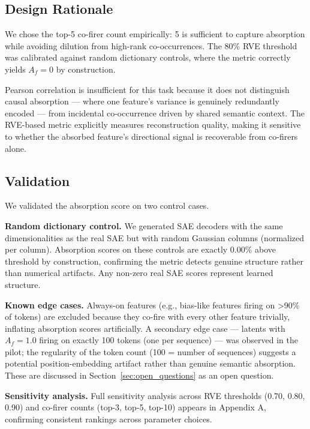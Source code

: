 \documentclass{article}
\begin{document}
\subsection{Design Rationale}

We chose the top-5 co-firer count empirically: 5 is sufficient to capture absorption while avoiding dilution from high-rank co-occurrences. The 80\% RVE threshold was calibrated against random dictionary controls, where the metric correctly yields $A_f = 0$ by construction.

Pearson correlation is insufficient for this task because it does not distinguish causal absorption --- where one feature's variance is genuinely redundantly encoded --- from incidental co-occurrence driven by shared semantic context. The RVE-based metric explicitly measures reconstruction quality, making it sensitive to whether the absorbed feature's directional signal is recoverable from co-firers alone.

\subsection{Validation}

We validated the absorption score on two control cases.

\textbf{Random dictionary control.} We generated SAE decoders with the same dimensionalities as the real SAE but with random Gaussian columns (normalized per column). Absorption scores on these controls are exactly 0.00\% above threshold by construction, confirming the metric detects genuine structure rather than numerical artifacts. Any non-zero real SAE scores represent learned structure.

\textbf{Known edge cases.} Always-on features (e.g., bias-like features firing on >90\% of tokens) are excluded because they co-fire with every other feature trivially, inflating absorption scores artificially. A secondary edge case --- latents with $A_f = 1.0$ firing on exactly 100 tokens (one per sequence) --- was observed in the pilot; the regularity of the token count (100 = number of sequences) suggests a potential position-embedding artifact rather than genuine semantic absorption. These are discussed in Section~\ref{sec:open_questions} as an open question.

\textbf{Sensitivity analysis.} Full sensitivity analysis across RVE thresholds (0.70, 0.80, 0.90) and co-firer counts (top-3, top-5, top-10) appears in Appendix A, confirming consistent rankings across parameter choices.
\end{document}
